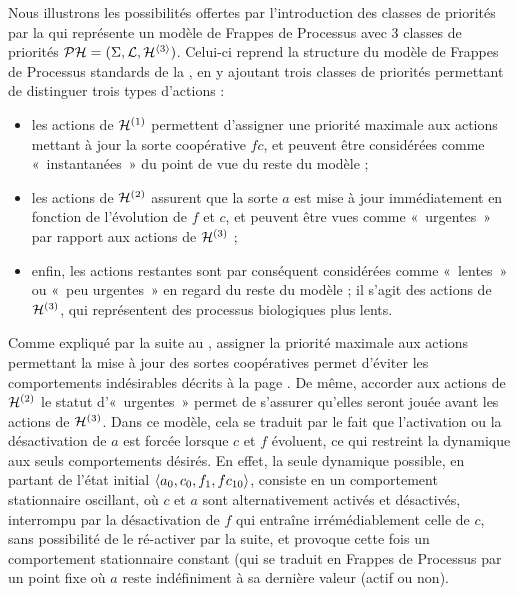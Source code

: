 \begin{example}
  Nous illustrons les possibilités offertes par l'introduction des classes de priorités
  par la  qui représente un modèle de Frappes de Processus
  avec 3 classes de priorités $\mathcal{PH} = (\Sigma, \mathcal{L}, \mathcal{H}^{{\langle 3 \rangle}})$.
  Celui-ci reprend la structure du modèle de Frappes de Processus standards
  de la ,
  en y ajoutant trois classes de priorités permettant de distinguer trois types d'actions :
  \begin{itemize}
    \item les actions de $\mathcal{H}^{(1)}$ permettent d'assigner une priorité maximale
      aux actions mettant à jour la sorte coopérative $fc$,
      et peuvent être considérées comme «~instantanées~» du point de vue du reste du modèle ;
    \item les actions de $\mathcal{H}^{(2)}$ assurent que la sorte $a$ est mise à jour immédiatement
      en fonction de l'évolution de $f$ et $c$,
      et peuvent être vues comme «~urgentes~» par rapport aux actions de $\mathcal{H}^{(3)}$ ;
    \item enfin, les actions restantes sont par conséquent considérées comme «~lentes~»
      ou «~peu urgentes~» en regard du reste du modèle ;
      il s'agit des actions de $\mathcal{H}^{(3)}$, qui représentent des processus biologiques
      plus lents.
  \end{itemize}
  Comme expliqué par la suite au ,
  assigner la priorité maximale aux actions permettant la mise à jour des
  sortes coopératives permet d'éviter les comportements indésirables
  décrits à la page .
  De même, accorder aux actions de $\mathcal{H}^{(2)}$ le statut d'«~urgentes~»
  permet de s'assurer qu'elles seront jouée avant les actions de $\mathcal{H}^{(3)}$.
  Dans ce modèle, cela se traduit par le fait que l'activation ou la désactivation de $a$
  est forcée lorsque $c$ et $f$ évoluent,
  ce qui restreint la dynamique aux seuls comportements désirés.
  En effet, la seule dynamique possible, en partant de l'état initial
  $\mbox{$\langle a_0, c_0, f_1, fc_{10} \rangle$}$,
  consiste en un comportement stationnaire oscillant,
  où $c$ et $a$ sont alternativement activés et désactivés,
  interrompu par la désactivation de $f$ qui entraîne irrémédiablement celle de $c$,
  sans possibilité de le ré-activer par la suite,
  et provoque cette fois un comportement stationnaire constant
  (qui se traduit en Frappes de Processus par un point fixe
  où $a$ reste indéfiniment à sa dernière valeur (actif ou non).

\end{example}
